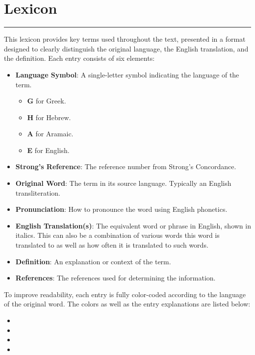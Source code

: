 \chapter{Lexicon}
\rule{\textwidth}{0.5pt}    %
\thispagestyle{fancy}


This lexicon provides key terms used throughout the text, presented in a format designed to clearly distinguish the original language, the English translation, and the definition. Each entry consists of six elements:
\begin{itemize}
	\item \textbf{Language Symbol}: A single-letter symbol indicating the language of the term. 
	\begin{itemize}
		\item \textbf{G} for Greek.
		\item \textbf{H} for Hebrew.
		\item \textbf{A} for Aramaic.
		\item \textbf{E} for English.
	\end{itemize}
	\item \textbf{Strong's Reference}: The reference number from Strong's Concordance.
	\item \textbf{Original Word}: The term in its source language. Typically an English transliteration.
	\item \textbf{Pronunciation}: How to pronounce the word using English phonetics.
	\item \textbf{English Translation(s)}: The equivalent word or phrase in English, shown in italics. This can also be a combination of various words this word is translated to as well as how often it is translated to such words.
	\item \textbf{Definition}: An explanation or context of the term.
	\item \textbf{References}: The references used for determining the information.
\end{itemize}

\medskip
To improve readability, each entry is fully color-coded according to the language of the original word. The colors as well as the entry explanations are listed below:
\begin{itemize}
    \item {}
	\item {}
	\item {}
	\item {}
\end{itemize}


